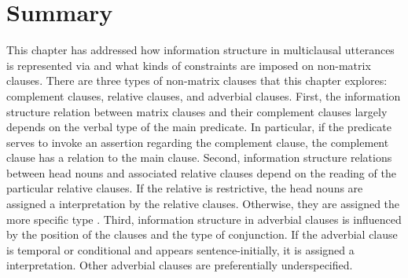 \section{Summary}
\label{10-2:ssec:Summary}


This chapter has addressed how information structure in multiclausal
utterances is represented via  and what kinds of
constraints are imposed on non-matrix clauses.
There are three types of non-matrix clauses that this chapter
explores: complement clauses, relative clauses, and adverbial
clauses. First, the information structure relation between matrix
clauses and their complement clauses largely depends on the verbal
type of the main predicate. In particular, if the predicate serves to
invoke an assertion regarding the complement clause, the complement
clause has a  relation to the main clause. Second, information structure relations between head nouns
and associated relative clauses depend on the reading of the
particular relative clauses. If the relative is restrictive, the head
nouns are assigned a  interpretation by the
relative clauses. Otherwise, they are assigned the more specific type
. Third, information structure in adverbial
clauses is influenced by the position of the clauses and the type
of conjunction. If the adverbial clause is temporal or conditional and
appears sentence-initially, it is assigned a 
interpretation. Other adverbial clauses are preferentially
underspecified.



